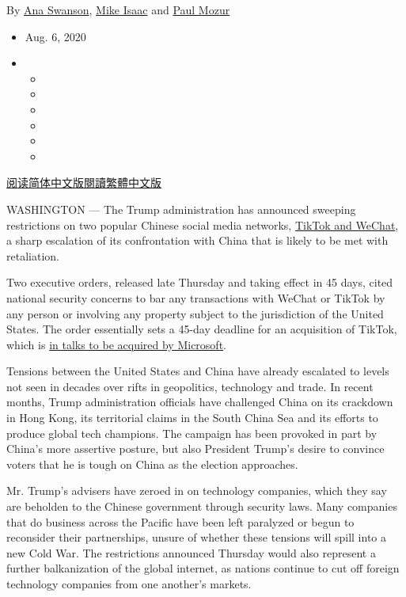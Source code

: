 By \href{https://www.nytimes.com/by/ana-swanson}{Ana Swanson},
\href{https://www.nytimes.com/by/mike-isaac}{Mike Isaac} and
\href{https://www.nytimes.com/by/paul-mozur}{Paul Mozur}

\begin{itemize}
\item
  Aug. 6, 2020
\item
  \begin{itemize}
  \item
  \item
  \item
  \item
  \item
  \item
  \end{itemize}
\end{itemize}

\href{https://cn.nytimes.com/usa/20200807/trump-wechat-tiktok-china/}{阅读简体中文版}\href{https://cn.nytimes.com/usa/20200807/trump-wechat-tiktok-china/zh-hant/}{閱讀繁體中文版}

WASHINGTON --- The Trump administration has announced sweeping
restrictions on two popular Chinese social media networks,
\href{https://www.nytimes.com/2020/08/07/business/trump-china-wechat-tiktok.html}{TikTok
and WeChat}, a sharp escalation of its confrontation with China that is
likely to be met with retaliation.

Two executive orders, released late Thursday and taking effect in 45
days, cited national security concerns to bar any transactions with
WeChat or TikTok by any person or involving any property subject to the
jurisdiction of the United States. The order essentially sets a 45-day
deadline for an acquisition of TikTok, which is
\href{https://www.nytimes.com/2020/08/03/technology/trump-tiktok-microsoft.html}{in
talks to be acquired by Microsoft}.

Tensions between the United States and China have already escalated to
levels not seen in decades over rifts in geopolitics, technology and
trade. In recent months, Trump administration officials have challenged
China on its crackdown in Hong Kong, its territorial claims in the South
China Sea and its efforts to produce global tech champions. The campaign
has been provoked in part by China's more assertive posture, but also
President Trump's desire to convince voters that he is tough on China as
the election approaches.

Mr. Trump's advisers have zeroed in on technology companies, which they
say are beholden to the Chinese government through security laws. Many
companies that do business across the Pacific have been left paralyzed
or begun to reconsider their partnerships, unsure of whether these
tensions will spill into a new Cold War. The restrictions announced
Thursday would also represent a further balkanization of the global
internet, as nations continue to cut off foreign technology companies
from one another's markets.


